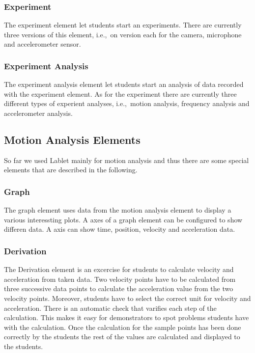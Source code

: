 \documentclass{sigchi}
\newcommand{\ie}{i.e.,\ }
\begin{document}
\subsubsection*{Experiment}
The experiment element let students start an experiments.  There are
currently three versions of this element, \ie on version each for the
camera, microphone and accelerometer sensor.

\subsubsection*{Experiment Analysis}
The experiment analysis element let students start an analysis of data
recorded with the experiment element.  As for the experiment there are
currently three different types of experient analyses, \ie motion
analysis, frequency analysis and accelerometer analysis.

\subsection{Motion Analysis Elements}
So far we used Lablet mainly for motion analysis and thus there are
some special elements that are described in the following.

\subsubsection*{Graph}
The graph element uses data from the motion analysis element to
display a various interessting plots.  A axes of a graph element can
be configured to show differen data.  A axis can show time, position,
velocity and acceleration data.

\subsubsection*{Derivation}
The Derivation element is an excercise for students to calculate
velocity and acceleration from taken data.  Two velocity points have to
be calculated from three successive data points to calculate
the acceleration value from the two velocity points.  Moreover,
students have to select the correct unit for velocity and
acceleration.  There is an automatic check that varifies each step of
the calculation.  This makes it easy for demonstrators to spot
problems students have with the calculation.  Once the calculation for
the sample points has been done correctly by the students the rest of
the values are calculated and displayed to the students.
\end{document}
